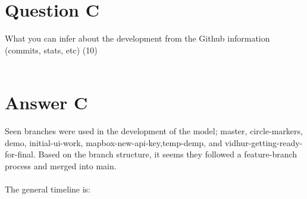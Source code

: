 \documentclass{scrreprt}
\begin{document}
\pagebreak
\section{Question C}\label{QC}
What you can infer about the development from the Github information (commits, stats, etc) (10)\\
\\

\section{Answer C}\label{AC}
Seen branches were used in the development of the model; master, circle-markers, demo, initial-ui-work, mapbox-new-api-key,temp-demp, and vidhur-getting-ready-for-final. Based on the branch structure, it seems they followed a feature-branch process and merged into main. \\
\\
The general timeline is:
\end{document}
